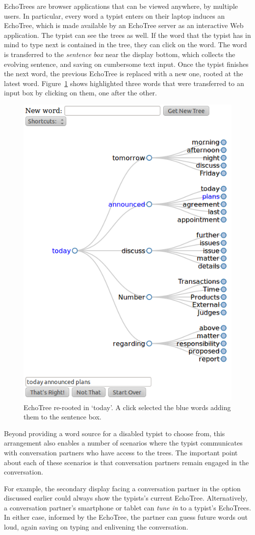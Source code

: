 \documentclass{sigchi}
\begin{document}
EchoTrees are browser applications that can be viewed anywhere, by
multiple users. In particular, every word a typist enters on their
laptop induces an EchoTree, which is made available by an EchoTree
server as an interactive Web application. The typist can see the trees
as well. If the word that the typist has in mind to type next is
contained in the tree, they can click on the word. The word is
transferred to the {\em sentence box} near the display bottom, which
collects the evolving sentence, and saving on cumbersome text
input. Once the typist finishes the next word, the previous EchoTree
is replaced with a new one, rooted at the latest
word. Figure~\ref{fig:todayTree} shows highlighted three words that
were transferred to an input box by clicking on them, one after the
other.
\begin{figure}
   \centering
   \includegraphics[width=0.6\columnwidth]{Figs/echoTreeRootToday.png}
   \caption{EchoTree re-rooted in `today'. A click selected the blue words
     adding them to the sentence box.}
   \label{fig:todayTree}
\end{figure}
Beyond providing a word source for a disabled typist to choose from,
this arrangement also enables a number of scenarios where the typist
communicates with conversation partners who have access to the
trees. The important point about each of these scenarios is that
conversation partners remain engaged in the conversation.

For example, the secondary display facing a conversation partner in
the option discussed earlier could always show the typists's current
EchoTree. Alternatively, a conversation partner's smartphone or tablet
can {\em tune in} to a typist's EchoTrees. In either case, informed by
the EchoTree, the partner can guess future words out loud, again
saving on typing and enlivening the conversation.
\end{document}
